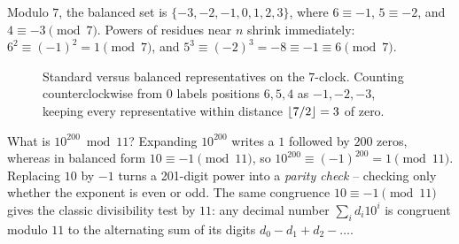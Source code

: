 Modulo $7$, the balanced set is $\{-3, -2, -1, 0, 1, 2, 3\}$, where $6 \equiv -1$, $5 \equiv -2$, and $4 \equiv -3 \pmod{7}$. Powers of residues near $n$ shrink immediately: $6^2 \equiv (-1)^2 = 1 \pmod{7}$, and $5^3 \equiv (-2)^3 = -8 \equiv -1 \equiv 6 \pmod{7}$.

\begin{figure}[htbp]
\centering
{}
\caption{Standard versus balanced representatives on the $7$-clock. Counting counterclockwise from $0$ labels positions $6, 5, 4$ as $-1, -2, -3$, keeping every representative within distance $\lfloor7/2\rfloor = 3$ of zero.}
\label{fig:ch03-balanced-dial}
\end{figure}

\begin{walkbox}
What is $10^{200} \bmod 11$? Expanding $10^{200}$ writes a $1$ followed by $200$ zeros, whereas in balanced form $10 \equiv -1 \pmod{11}$, so $10^{200} \equiv (-1)^{200} = 1 \pmod{11}$. Replacing $10$ by $-1$ turns a 201-digit power into a \emph{parity check} -- checking only whether the exponent is even or odd. The same congruence $10 \equiv -1 \pmod{11}$ gives the classic divisibility test by $11$: any decimal number $\sum_i d_i 10^i$ is congruent modulo $11$ to the alternating sum of its digits $d_0 - d_1 + d_2 - \dots$.
\end{walkbox}

